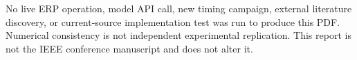 No live ERP operation, model API call, new timing campaign, external literature discovery, or current-source implementation test was run to produce this PDF. Numerical consistency is not independent experimental replication. This report is not the IEEE conference manuscript and does not alter it.


